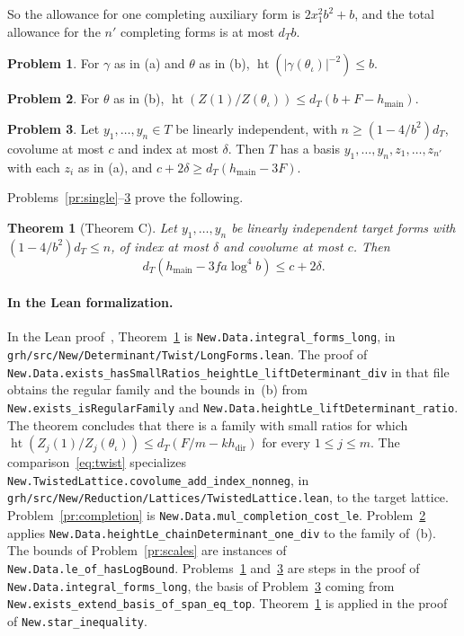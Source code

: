 \documentclass[reqno]{amsart}
\theoremstyle{definition}
\newtheorem{problem}{Problem}[section]
\theoremstyle{plain}
\newtheorem{theorem}{Theorem}[section]
\newcommand{\main}{h_{\mathrm{main}}}
\newcommand{\hdir}{h_{\mathrm{dir}}}
\newcommand{\hgt}{\operatorname{ht}}
\newcommand{\lean}[1]{\texttt{#1}}
\begin{document}
So the allowance for one completing auxiliary form is \(2x_1^2b^2 + b\), and the total allowance for the \(n'\) completing forms is at most \(d_T b\).

\begin{problem}\label{pr:denom}
For \(\gamma\) as in (a) and \(\theta\) as in (b), \(\hgt(\lvert\gamma(\theta_\iota)\rvert^{-2}) \le b\).
\end{problem}

\begin{problem}\label{pr:volume}
For \(\theta\) as in (b), \(\hgt(Z(1)/Z(\theta_\iota)) \le d_T(b + F - \main)\).
\end{problem}

\begin{problem}\label{pr:C}
Let \(y_1, \dots, y_n \in T\) be linearly independent, with \(n \ge (1 - 4/b^2)d_T\), covolume at most \(c\) and index at most \(\delta\).  Then \(T\) has a basis \(y_1, \dots, y_n, z_1, \dots, z_{n'}\) with each \(z_i\) as in (a), and \(c + 2\delta \ge d_T(\main - 3F)\).
\end{problem}

Problems~\ref{pr:single}--\ref{pr:C} prove the following.

\begin{theorem}[Theorem C]\label{thm:C}
Let \(y_1, \dots, y_n\) be linearly independent target forms with \((1 - 4/b^2)d_T \le n\), of index at most \(\delta\) and covolume at most \(c\).  Then
\[
  d_T(\main - 3fa\log^4 b) \le c + 2\delta .
\]
\end{theorem}

\paragraph{In the Lean formalization.}  In the Lean proof~\cite{GL}, Theorem~\ref{thm:C} is \lean{New.Data.integral\_forms\_long}, in \lean{grh/src/New/Determinant/Twist/LongForms.lean}.  The proof of \lean{New.Data.exists\_hasSmallRatios\_heightLe\_liftDeterminant\_div} in that file obtains the regular family and the bounds in~(b) from \lean{New.exists\_isRegularFamily} and \lean{New.Data.heightLe\_liftDeterminant\_ratio}.  The theorem concludes that there is a family with small ratios for which \(\hgt(Z_j(1)/Z_j(\theta_\iota)) \le d_T(F/m-k\hdir)\) for every \(1 \le j \le m\).  The comparison~\eqref{eq:twist} specializes \lean{New.TwistedLattice.covolume\_add\_index\_nonneg}, in \lean{grh/src/New/Reduction/Lattices/TwistedLattice.lean}, to the target lattice.  Problem~\ref{pr:completion} is \lean{New.Data.mul\_completion\_cost\_le}.  Problem~\ref{pr:volume} applies \lean{New.Data.heightLe\_chainDeterminant\_one\_div} to the family of~(b).  The bounds of Problem~\ref{pr:scales} are instances of \lean{New.Data.le\_of\_hasLogBound}.  Problems~\ref{pr:denom} and~\ref{pr:C} are steps in the proof of \lean{New.Data.integral\_forms\_long}, the basis of Problem~\ref{pr:C} coming from \lean{New.exists\_extend\_basis\_of\_span\_eq\_top}.  Theorem~\ref{thm:C} is applied in the proof of \lean{New.star\_inequality}.
\end{document}
